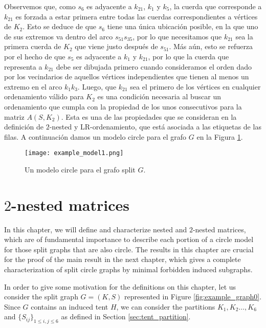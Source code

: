 \documentclass[12pt]{book}
\theoremstyle{plain}
\theoremstyle{remark}
\begin{document}
Observemos que, como $s_6$ es adyacente a $k_{21}$, $k_1$ y $k_5$, la cuerda que corresponde a $k_{21}$ es forzada a estar primera entre todas las cuerdas correspondientes a vértices de $K_2$. Esto se deduce de que $s_6$ tiene una única ubicación posible, en la que uno de sus extremos va dentro del arco $s_{51} s_{35}$, por lo que necesitamos que $k_{21}$ sea la primera cuerda de $K_2$ que viene justo después de $s_{51}$. Más aún, esto se refuerza por el hecho de que $s_5$ es adyacente a $k_1$ y $k_{21}$, por lo que la cuerda que representa a $k_{21}$ debe ser dibujada primero cuando consideramos el orden dado por los vecindarios de aquellos vértices independientes que tienen al menos un extremo en el arco $k_1 k_3$. Luego, que $k_{21}$ sea el primero de los vértices en cualquier ordenamiento válido para $K_2$ es una condición necesaria al buscar un ordenamiento que cumpla con la propiedad de los unos consecutivos para la matriz $A(S,K_2)$. Esta es una de las propiedades que se consideran en la definición de $2$-nested y LR-ordenamiento, que está asociada a las etiquetas de las filas. A continuación damos un modelo circle para el grafo $G$ en la Figura \ref{fig:example_model1_}.


\begin{figure}[h!] 	\centering
	\texttt{[image: example\_model1.png]}
	\caption{Un modelo circle para el grafo split $G$.}
	\label{fig:example_model1_}
\end{figure}




%
\chapter{$2$-nested matrices} \label{chapter:2nested_matrices}


In this chapter, we will define and characterize nested and $2$-nested matrices, which are of fundamental importance to describe each portion of a circle model for those split graphs that are also circle. The results in this chapter are crucial for the proof of the main result in the next chapter, which gives a complete characterization of split circle graphs by minimal forbidden induced subgraphs. 

In order to give some motivation for the definitions on this chapter, let us consider the split graph $G=(K,S)$ represented in Figure \ref{fig:example_graph0}. Since $G$ contains an induced tent $H$, we can consider the partitions $K_1, K_2 \ldots, K_6$ and $\{ S_{ij} \}_{1 \leq i,j \leq 6}$ as defined in Section \ref{sec:tent_partition}.%
\end{document}
